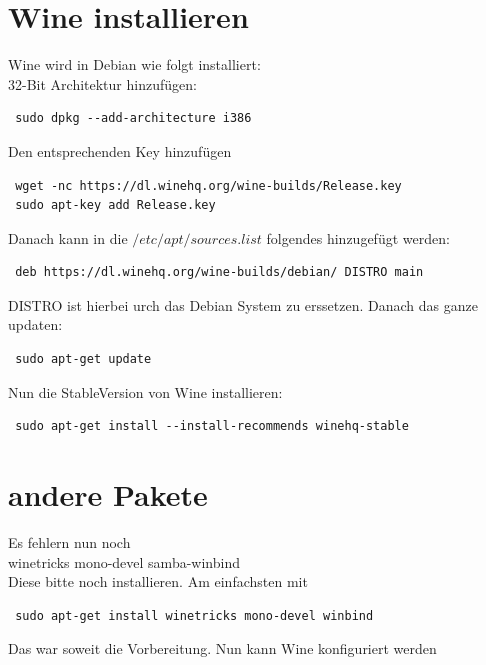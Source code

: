 \documentclass[11pt,fleqn]{book} %
\numberwithin{equation}{section} %
\numberwithin{figure}{section} %
\numberwithin{table}{section} %
\begin{document}
\section{Wine installieren}
Wine wird in Debian wie folgt installiert:\\
32-Bit Architektur hinzufügen:
\begin{lstlisting}
 sudo dpkg --add-architecture i386
\end{lstlisting}
Den entsprechenden Key hinzufügen
\begin{lstlisting}
 wget -nc https://dl.winehq.org/wine-builds/Release.key 
 sudo apt-key add Release.key
\end{lstlisting}
Danach kann in die $/etc/apt/sources.list$ folgendes hinzugefügt werden:
\begin{lstlisting}
 deb https://dl.winehq.org/wine-builds/debian/ DISTRO main
\end{lstlisting}
DISTRO ist hierbei urch das Debian System zu erssetzen. Danach das ganze updaten:
\begin{lstlisting}
 sudo apt-get update
\end{lstlisting}
Nun die StableVersion von Wine installieren:
\begin{lstlisting}
 sudo apt-get install --install-recommends winehq-stable
\end{lstlisting}
\section{andere Pakete}
Es fehlern nun noch\\
winetricks mono-devel samba-winbind\\
Diese bitte noch installieren. Am einfachsten mit
\begin{lstlisting}
 sudo apt-get install winetricks mono-devel winbind
\end{lstlisting}
Das war soweit die Vorbereitung. Nun kann Wine konfiguriert werden
\end{document}
